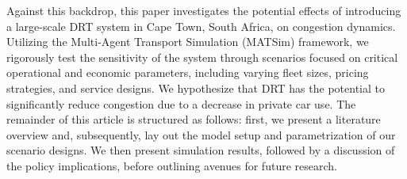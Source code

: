 \documentclass[main.tex]{subfiles}
\begin{document}
Against this backdrop, this paper investigates the potential effects of introducing a large-scale DRT system in Cape Town, South Africa, on congestion dynamics. Utilizing the Multi-Agent Transport Simulation (MATSim) framework, we rigorously test the sensitivity of the system through scenarios focused on critical operational and economic parameters, including varying fleet sizes, pricing strategies, and service designs. We hypothesize that DRT has the potential to significantly reduce congestion due to a decrease in private car use. The remainder of this article is structured as follows: first, we present a literature overview and, subsequently, lay out the model setup and parametrization of our scenario designs. We then present simulation results, followed by a discussion of the policy implications, before outlining avenues for future research.
\end{document}
